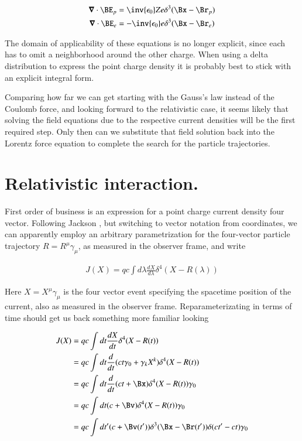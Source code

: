 \begin{align}\label{eqn:nuclearInteraction:boo6}
\spacegrad \cdot \BE_p &= \inv{\epsilon_0} Z e \delta^3(\Bx - \Br_p) \\
\spacegrad \cdot \BE_e &= -\inv{\epsilon_0} e \delta^3(\Bx - \Br_e) 
\end{align}

The domain of applicability of these equations is no longer explicit, since each has to omit a neighborhood around the other charge.  When using a delta distribution to express the point charge density it is probably best to stick with an explicit integral form.

Comparing how far we can get starting with the Gauss's law instead of the Coulomb force, and looking forward to the relativistic case, it seems likely that solving the field equations due to the respective current densities will be the first required step.  Only then can we substitute that field solution back into the Lorentz force equation to complete the search for the particle trajectories.

\section{Relativistic interaction.}

First order of business is an expression for a point charge current density four vector.  Following Jackson \citep{jackson1975cew}, but switching to vector notation from coordinates, we can apparently employ an arbitrary parametrization for the four-vector particle trajectory $R = R^\mu \gamma_\mu$, as measured in the observer frame, and write

\begin{align}\label{eqn:nuclearInteraction:boo7}
J(X) = q c \int d\lambda \frac{dX}{d\lambda} \delta^4 (X - R(\lambda))
\end{align}

Here $X = X^\mu \gamma_\mu$ is the four vector event specifying the spacetime position of the current, also as measured in the observer frame.  Reparameterizating in terms of time should get us back something more familiar looking

\begin{align*}
J(X) 
&= q c \int dt \frac{dX}{dt} \delta^4 (X - R(t)) \\
&= q c \int dt \frac{d}{dt} (c t \gamma_0 + \gamma_k X^k)\delta^4 (X - R(t)) \\
&= q c \int dt \frac{d}{dt} (c t + \Bx)\delta^4 (X - R(t)) \gamma_0 \\
&= q c \int dt (c + \Bv)\delta^4 (X - R(t)) \gamma_0 \\
&= q c \int dt' (c + \Bv(t'))\delta^3 (\Bx - \Br(t')) \delta(c t' - c t) \gamma_0 \\
\end{align*}

